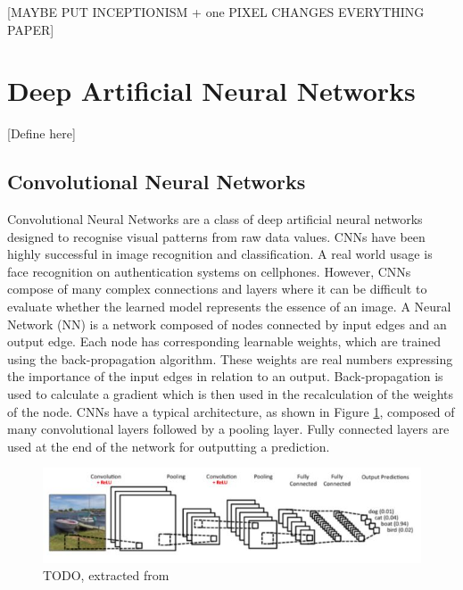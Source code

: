 [MAYBE PUT INCEPTIONISM + one PIXEL CHANGES EVERYTHING PAPER]

\section{Deep Artificial Neural Networks}
[Define here]
\subsection{Convolutional Neural Networks} \label{subsubsec:cnn}

Convolutional Neural Networks \cite{lecun2015deep} are a class of deep artificial neural networks designed to recognise visual patterns from raw data values. CNNs have been highly successful in image recognition and classification. A real world usage is face recognition on authentication systems on cellphones. However, CNNs compose of many complex connections and layers where it can be difficult to evaluate whether the learned model represents the essence of an image. A Neural Network (NN) \cite{haykin2004comprehensive} is a network composed of nodes connected by input edges and an output edge. Each node has corresponding learnable weights, which are trained using the back-propagation algorithm. These weights are real numbers expressing the importance of the input edges in relation to an output.  Back-propagation is used to calculate a gradient which is then used in the recalculation of the weights of the node. CNNs have a typical architecture, as shown in Figure \ref{fig:cnnlayers}, composed of many convolutional layers followed by a pooling layer. Fully connected layers are used at the end of the network for outputting a prediction.

\begin{figure}[H]
	\begin{center}
		\includegraphics[width=150mm, scale=1]{cnn.JPG}
		\caption{TODO, extracted from \cite{mordvintsev2015inceptionism}}
		\label{fig:cnnlayers}
	\end{center}
\end{figure}

